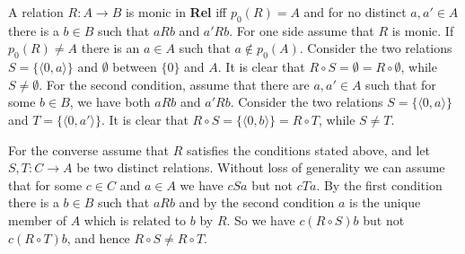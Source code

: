 A relation $R:A\rightarrow B$ is monic in \textbf{Rel} iff $p_0(R)=A$ and for no distinct $a,a'\in A$ there is a $b\in B$ such that $aRb$ and $a'Rb$. For one side assume that $R$ is monic. If $p_0(R)\neq A$ there is an $a\in A$ such that $a\not\in p_0(A)$. Consider the two relations $S=\{\langle 0,a\rangle\}$ and $\emptyset$ between $\{0\}$ and $A$. It is clear that $R\circ S=\emptyset=R\circ\emptyset$, while $S\neq\emptyset$. For the second condition, assume that there are $a,a'\in A$ such that for some $b\in B$, we have both $aRb$ and $a'Rb$. Consider the two relations $S=\{\langle 0,a\rangle\}$ and $T=\{\langle 0,a'\rangle\}$. It is clear that
$R\circ S=\{\langle 0,b\rangle\}=R\circ T$, while $S\neq T$.

For the converse assume that $R$ satisfies the conditions stated above, and let $S,T:C\rightarrow A$ be two distinct relations. Without loss of generality we can assume that for some $c\in C$ and $a\in A$ we have $cSa$ but not $cTa$. By the first condition there is a $b\in B$ such that $aRb$ and by the second condition $a$ is the unique member of $A$ which is related to $b$ by $R$. So we have $c(R\circ S)b$ but not $c(R\circ T)b$, and hence $R\circ S\neq R\circ T$.